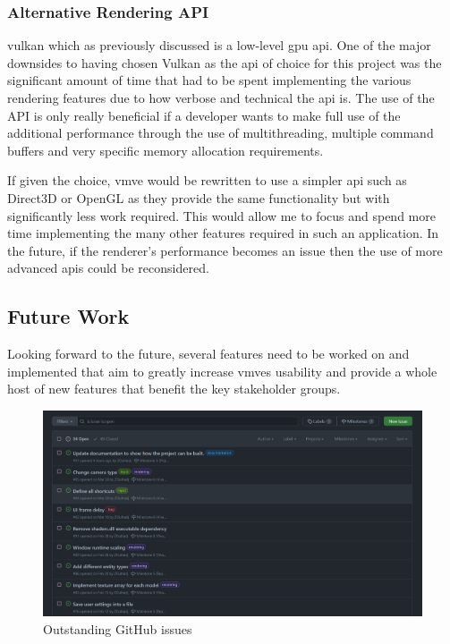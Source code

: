 \documentclass[11pt]{article}
\begin{document}
\subsubsection{Alternative Rendering API}
\gls*{vulkan} which as previously discussed is a low-level \gls*{gpu}
\gls*{api}. One of the major downsides to having chosen Vulkan as the \gls*{api}
of choice for this project was the significant amount of time that had to be
spent implementing the various rendering features due to how verbose and
technical the \gls*{api} is. The use of the API is only really beneficial if a
developer wants to make full use of the additional performance through the use
of multithreading, multiple command buffers and very specific memory allocation
requirements.

If given the choice, \gls*{vmve} would be rewritten to use a simpler \gls*{api}
such as Direct3D or OpenGL as they provide the same functionality but with
significantly less work required. This would allow me to focus and spend more
time implementing the many other features required in such an application. In
the future, if the renderer's performance becomes an issue then the use of more
advanced \glspl*{api} could be reconsidered.


\subsection{Future Work} \label{future_work} 
Looking forward to the future, several features need to be worked on and
implemented that aim to greatly increase \glspl*{vmve} usability and provide a
whole host of new features that benefit the key stakeholder groups.

\begin{figure}[H]
  \centering
  \includegraphics[width=\textwidth]{images/github_issues.png}
  \caption{Outstanding GitHub issues}
  \label{fig:github_issues}
\end{figure}
\end{document}
